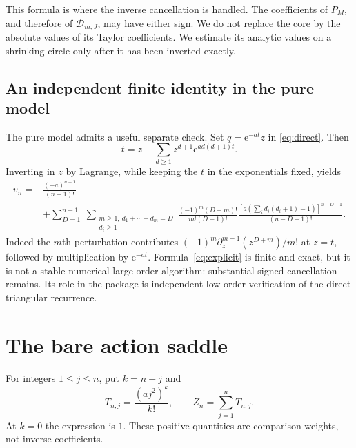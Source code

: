 \documentclass[11pt,a4paper]{article}
\numberwithin{equation}{section}
\theoremstyle{definition}
\theoremstyle{remark}\newtheorem{remark}[theorem]{Remark}
\newcommand{\ee}{\mathrm e}\newcommand{\dd}{\mathrm d}
\begin{document}
This formula is where the inverse cancellation is handled. The coefficients
of $P_M$, and therefore of $\mathcal D_{m,J}$, may have either sign. We do
not replace the core by the absolute values of its Taylor coefficients.
We estimate its analytic values on a shrinking circle only after it has
been inverted exactly.

\subsection{An independent finite identity in the pure model}
The pure model admits a useful separate check. Set $q=\ee^{-at}z$ in
\eqref{eq:direct}. Then
\begin{equation}
 t=z+\sum_{d\ge1}z^{d+1}\ee^{a d(d+1)t}.
 \label{eq:excesskernel}
\end{equation}
Inverting in $z$ by Lagrange, while keeping the $t$ in the exponentials
fixed, yields
\begin{equation}
\begin{split}
 v_n={}&\frac{(-a)^{n-1}}{(n-1)!}\\
 &+\sum_{D=1}^{n-1}\ \sum_{\substack{m\ge1,\ d_1+\cdots+d_m=D\\ d_i\ge1}}
 \frac{(-1)^m(D+m)!}{m!(D+1)!}
 \frac{\left[a\left(\sum_i d_i(d_i+1)-1\right)\right]^{n-D-1}}
 {(n-D-1)!}.
\end{split}
\label{eq:explicit}
\end{equation}
Indeed the $m$th perturbation contributes
$(-1)^m\partial_z^{m-1}(z^{D+m})/m!$ at $z=t$, followed by multiplication
by $\ee^{-at}$. Formula~\eqref{eq:explicit} is finite and exact, but it is
not a stable numerical large-order algorithm: substantial signed
cancellation remains. Its role in the package is independent low-order
verification of the direct triangular recurrence.

\section{The bare action saddle}
\label{sec:bare}

For integers $1\le j\le n$, put $k=n-j$ and
\begin{equation}
 T_{n,j}=\frac{(aj^2)^k}{k!},\qquad
 Z_n=\sum_{j=1}^nT_{n,j}.
 \label{eq:T}
\end{equation}
At $k=0$ the expression is $1$. These positive quantities are comparison
weights, not inverse coefficients.
\end{document}
